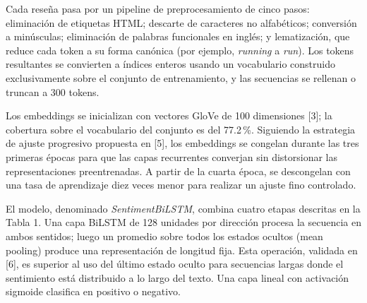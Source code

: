 \documentclass[letterpaper, 10pt, conference]{ieeeconf}
\begin{document}
Cada rese\~na pasa por un pipeline de preprocesamiento de cinco pasos:
eliminaci\'on de etiquetas HTML; descarte de caracteres no alfab\'eticos;
conversi\'on a min\'usculas; eliminaci\'on de palabras funcionales en ingl\'es;
y lematizaci\'on, que reduce cada token a su forma can\'onica (por ejemplo,
\textit{running} a \textit{run}). Los tokens resultantes se convierten a
\'indices enteros usando un vocabulario construido exclusivamente sobre el
conjunto de entrenamiento, y las secuencias se rellenan o truncan a 300 tokens.

Los embeddings se inicializan con vectores GloVe de 100 dimensiones [3]; la
cobertura sobre el vocabulario del conjunto es del 77.2\,\%. Siguiendo la
estrategia de ajuste progresivo propuesta en [5], los embeddings se congelan
durante las tres primeras \'epocas para que las capas recurrentes converjan sin
distorsionar las representaciones preentrenadas. A partir de la cuarta \'epoca,
se descongelan con una tasa de aprendizaje diez veces menor para realizar un
ajuste fino controlado.

El modelo, denominado \textit{SentimentBiLSTM}, combina cuatro etapas descritas
en la Tabla 1. Una capa BiLSTM de 128 unidades por direcci\'on procesa la
secuencia en ambos sentidos; luego un promedio sobre todos los estados ocultos
(mean pooling) produce una representaci\'on de longitud fija. Esta operaci\'on,
validada en [6], es superior al uso del \'ultimo estado oculto para secuencias
largas donde el sentimiento est\'a distribuido a lo largo del texto. Una capa
lineal con activaci\'on sigmoide clasifica en positivo o negativo.

\begin{table}[h]
\centering
\caption{Capas del modelo \textit{SentimentBiLSTM}.}
\label{tab:arquitectura}
\end{table}
\end{document}
